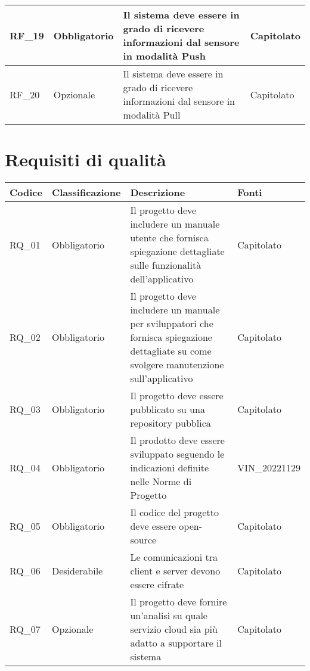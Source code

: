 \begin{center}
\begin{xltabular}{\linewidth}{|l|l|X|l|}
        \hline
        RF\_19 & Obbligatorio & Il sistema deve essere in grado di ricevere informazioni dal sensore in modalità Push & Capitolato \\

        \hline
        RF\_20 & Opzionale & Il sistema deve essere in grado di ricevere informazioni dal sensore in modalità Pull & Capitolato \\

        \hline
    \end{xltabular}
\end{center}


\section{Requisiti di qualità}
\begin{center}
    \begin{xltabular}{\linewidth}{|l|l|X|l|}
    \hline
    \textbf{Codice} & \textbf{Classificazione} & \textbf{Descrizione} & \textbf{Fonti} \\
    \hline
    RQ\_01 & Obbligatorio & Il progetto deve includere un manuale utente che fornisca spiegazione dettagliate sulle funzionalità dell'applicativo & Capitolato \\

    \hline
    RQ\_02 & Obbligatorio & Il progetto deve includere un manuale per sviluppatori che fornisca spiegazione dettagliate su come svolgere manutenzione sull'applicativo & Capitolato \\

    \hline
    RQ\_03 & Obbligatorio & Il progetto deve essere pubblicato su una repository pubblica & Capitolato \\

    \hline
    RQ\_04 & Obbligatorio & Il prodotto deve essere sviluppato seguendo le indicazioni definite nelle Norme di Progetto & VIN\_20221129 \\

    \hline
    RQ\_05 & Obbligatorio & Il codice del progetto deve essere open-source & Capitolato \\

    \hline
    RQ\_06 & Desiderabile & Le comunicazioni tra client e server devono essere cifrate & Capitolato \\

    \hline
    RQ\_07 & Opzionale & Il progetto deve fornire un'analisi su quale servizio cloud sia più adatto a supportare il sistema & Capitolato \\


\end{xltabular}
\end{center}
